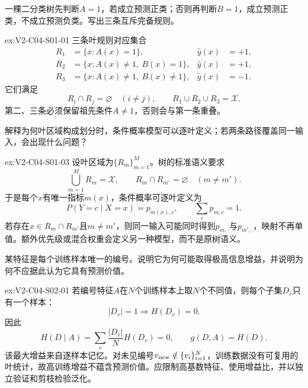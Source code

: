 \begin{SLChapterExercisePairSection}
\begin{exercise}\label{ex:V2-C04-S01-01}
一棵二分类树先判断$A=1$，若成立预测正类；否则再判断$B=1$，成立预测正类，不成立预测负类。写出三条互斥完备规则。
\end{exercise}
\ifSLFullEdition
{}\label{sol:V2-C04-S01-01}
\begin{chapterexercisesolution}{ex:V2-C04-S01-01}
三条叶规则对应集合
\[
\begin{aligned}
R_1&=\{x:A(x)=1\},&\widehat y(x)&=+1,\\
R_2&=\{x:A(x)\neq1,\ B(x)=1\},&\widehat y(x)&=+1,\\
R_3&=\{x:A(x)\neq1,\ B(x)\neq1\},&\widehat y(x)&=-1.
\end{aligned}
\]
它们满足
\[
R_i\cap R_j=\varnothing\quad(i\neq j),
\qquad
R_1\cup R_2\cup R_3=\mathcal X.
\]
第二、三条必须保留祖先条件$A\neq1$，否则会与第一条重叠。
\end{chapterexercisesolution}
\fi

\begin{exercise}\label{ex:V2-C04-S01-03}
解释为何叶区域构成划分时，条件概率模型可以逐叶定义；若两条路径覆盖同一输入，会出现什么问题？
\end{exercise}
\ifSLFullEdition
{}\label{sol:V2-C04-S01-03}
\begin{chapterexercisesolution}{ex:V2-C04-S01-03}
设叶区域为$\{R_m\}_{m=1}^{M}$。树的标准语义要求
\[
\bigcup_{m=1}^{M}R_m=\mathcal X,
\qquad
R_m\cap R_{m'}=\varnothing\quad(m\neq m').
\]
于是每个$x$有唯一指标$m(x)$，条件概率可逐叶定义为
\[
P(Y=c\mid X=x)=p_{m(x),c},
\qquad
\sum_c p_{m,c}=1.
\]
若存在$x\in R_m\cap R_{m'}$且$m\neq m'$，则同一输入可能同时得到$p_{m,\cdot}$与$p_{m',\cdot}$，映射不再单值。额外优先级或混合权重会定义另一种模型，而不是原树语义。
\end{chapterexercisesolution}
\fi

\begin{exercise}\label{ex:V2-C04-S02-01}
某特征是每个训练样本唯一的编号。说明它为何可能取得极高信息增益，并说明为何不应据此认为它具有预测价值。
\end{exercise}
\ifSLFullEdition
{}\label{sol:V2-C04-S02-01}
\begin{chapterexercisesolution}{ex:V2-C04-S02-01}
若编号特征$A$在$N$个训练样本上取$N$个不同值，则每个子集$D_v$只有一个样本：
\[
|D_v|=1
\Longrightarrow
H(D_v)=0.
\]
因此
\[
H(D\mid A)=\sum_v\frac{|D_v|}{N}H(D_v)=0,
\qquad
g(D,A)=H(D).
\]
该最大增益来自逐样本记忆。对未见编号$v_{\rm new}\notin\{v_i\}_{i=1}^{N}$，训练数据没有可复用的叶统计，故高训练增益不蕴含预测价值。应限制高基数特征、使用增益比，并以独立验证和剪枝检验泛化。
\end{chapterexercisesolution}
\fi


\end{SLChapterExercisePairSection}
